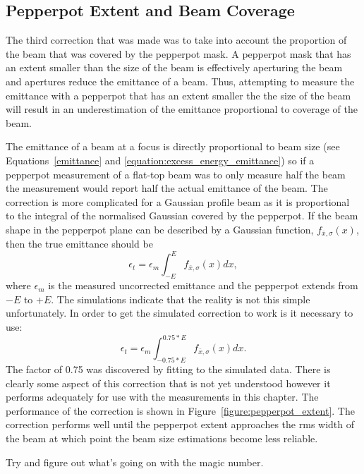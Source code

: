 \subsection{Pepperpot Extent and Beam Coverage}
The third correction that was made was to take into account the proportion of the beam that was covered by the pepperpot mask.
A pepperpot mask that has an extent smaller than the size of the beam is effectively aperturing the beam and apertures reduce the emittance of a beam.
Thus, attempting to measure the emittance with a pepperpot that has an extent smaller the the size of the beam will result in an underestimation of the emittance proportional to coverage of the beam.

The emittance of a beam at a focus is directly proportional to beam size (see Equations~\ref{emittance} and \ref{equation:excess_energy_emittance}) so if a pepperpot measurement of a flat-top beam was to only measure half the beam the measurement would report half the actual emittance of the beam.
The correction is more complicated for a Gaussian profile beam as it is proportional to the integral of the normalised Gaussian covered by the pepperpot.
If the beam shape in the pepperpot plane can be described by a Gaussian function, $f_{\bar{x},\sigma}(x)$, then the true emittance should be
\begin{equation}
\epsilon_t = \epsilon_m \int_{-E}^{E} f_{\bar{x}, \sigma}(x) dx,
\end{equation}
where $\epsilon_m$ is the measured uncorrected emittance and the pepperpot extends from $-E$ to $+E$.
The simulations indicate that the reality is not this simple unfortunately. In order to get the simulated correction to work is it necessary to use:
\begin{equation}
\epsilon_t = \epsilon_m \int_{-0.75*E}^{0.75*E} f_{\bar{x}, \sigma}(x) dx.
\end{equation}
The factor of 0.75 was discovered by fitting to the simulated data.
There is clearly some aspect of this correction that is not yet understood however it performs adequately for use with the measurements in this chapter.
The performance of the correction is shown in Figure~\ref{figure:pepperpot_extent}.
The correction performs well until the pepperpot extent approaches the \gls{rms} width of the beam at which point the beam size estimations become less reliable.

{\color{red}
Try and figure out what's going on with the magic number.
}

